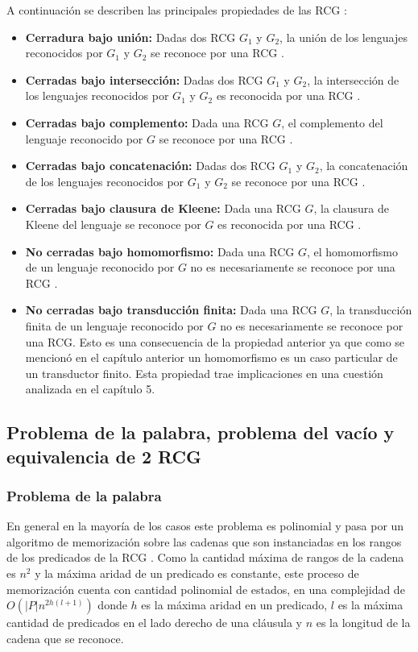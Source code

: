 \documentclass[12pt]{article}
\begin{document}
A continuación se describen las principales propiedades de las RCG \cite{propertiesRCGBib}:
\begin{itemize}
    \item \textbf{Cerradura bajo unión:} Dadas dos RCG $G_1$ y $G_2$, la unión de los lenguajes reconocidos por $G_1$ y $G_2$ se reconoce por una RCG \cite{mainRCGBib}.
    \item \textbf{Cerradas bajo intersección:} Dadas dos RCG $G_1$ y $G_2$, la intersección de los lenguajes reconocidos por $G_1$ y $G_2$ es reconocida por una RCG \cite{mainRCGBib}.
    \item \textbf{Cerradas bajo complemento:} Dada una RCG $G$, el complemento del lenguaje reconocido por $G$ se reconoce por una RCG \cite{mainRCGBib}.
    \item \textbf{Cerradas bajo concatenación:} Dadas dos RCG $G_1$ y $G_2$, la concatenación de los lenguajes reconocidos por $G_1$ y $G_2$ se reconoce por una RCG \cite{mainRCGBib}.
    \item \textbf{Cerradas bajo clausura de Kleene:} Dada una RCG $G$, la clausura de Kleene del lenguaje se reconoce por $G$ es reconocida por una RCG \cite{mainRCGBib}.
    \item  \textbf{No cerradas bajo homomorfismo:} Dada una RCG $G$, el homomorfismo de un lenguaje reconocido por $G$ no es necesariamente se reconoce por una RCG \cite{propertiesRCGBib}.
    \item  \textbf{No cerradas bajo transducción finita:} Dada una RCG $G$, la transducción finita de un lenguaje reconocido por $G$ no es necesariamente se reconoce por una RCG.
          Esto es una consecuencia de la propiedad anterior ya que como se mencionó en el capítulo anterior un homomorfismo es un caso particular de un transductor finito.
          Esta propiedad trae implicaciones en una cuestión analizada en el capítulo 5.
\end{itemize}


\subsection{Problema de la palabra, problema del vacío y equivalencia de 2 RCG}

\subsubsection{Problema de la palabra}

En general en la mayoría de los casos este problema es polinomial y pasa
por un algoritmo de memorización sobre las cadenas que son instanciadas en los rangos de los predicados de la
RCG \cite{mainRCGBib}.  Como la cantidad máxima de rangos de la cadena es $n^2$ y la máxima aridad de un
predicado es constante, este proceso de memorización cuenta con cantidad polinomial de
estados, en una complejidad de $O(|P|n^{2h(l+1)})$ donde $h$ es la máxima aridad en un predicado, $l$
es la máxima cantidad de predicados en el lado derecho de una cláusula y $n$ es la longitud de la cadena
que se reconoce.
\end{document}
